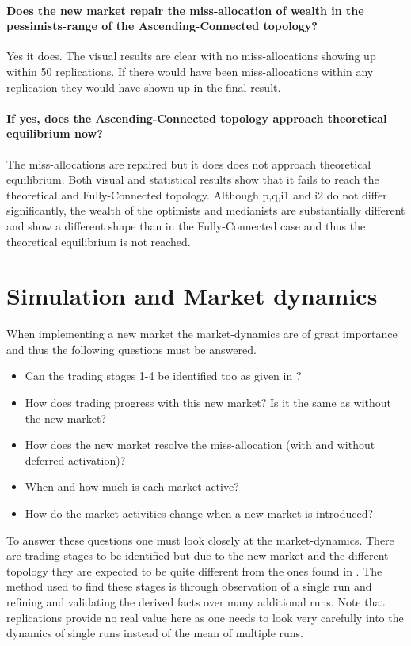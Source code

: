 \documentclass[Bachelorarbeit.tex]{subfiles}
\begin{document}
\paragraph{Does the new market repair the miss-allocation of wealth in the pessimists-range of the Ascending-Connected topology?}
Yes it does. The visual results are clear with no miss-allocations showing up within 50 replications. If there would have been miss-allocations within any replication they would have shown up in the final result.

\paragraph{If yes, does the Ascending-Connected topology approach theoretical equilibrium now?}
The miss-allocations are repaired but it does does not approach theoretical equilibrium. Both visual and statistical results show that it fails to reach the theoretical and Fully-Connected topology. Although p,q,i1 and i2 do not differ significantly, the wealth of the optimists and medianists are substantially different and show a different shape than in the Fully-Connected case and thus the theoretical equilibrium is not reached.

\section{Simulation and Market dynamics}
When implementing a new market the market-dynamics are of great importance and thus the following questions must be answered.

\begin{itemize}
\item Can the trading stages 1-4 be identified too as given in \cite{Breuer2015}?
\item How does trading progress with this new market? Is it the same as without the new market?
\item How does the new market resolve the miss-allocation (with and without deferred activation)?
\item When and how much is each market active? 
\item How do the market-activities change when a new market is introduced?
\end{itemize}

To answer these questions one must look closely at the market-dynamics. There are trading stages to be identified but due to the new market and the different topology they are expected to be quite different from the ones found in \cite{Breuer2015}. The method used to find these stages is through observation of a single run and refining and validating the derived facts over many additional runs. Note that replications provide no real value here as one needs to look very carefully into the dynamics of single runs instead of the mean of multiple runs.
\end{document}
